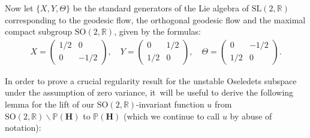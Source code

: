 \documentclass[10pt]{amsart}
\theoremstyle{plain}
\theoremstyle{definition}
\numberwithin{equation}{subsection}
\newcommand\bP{\mathbb{P}}
\newcommand\bR{\mathbb{R}}\let\R\bR
\newcommand{\SL}{\mathrm{SL}}
\newcommand{\SO}{\mathrm{SO}}
\newcommand{\bfH}{\boldsymbol{H}}
\begin{document}
Now let $\{X,Y, \Theta\}$ be the standard generators of the Lie algebra of $\SL(2, \R)$ corresponding to the geodesic flow, the orthogonal geodesic flow and the maximal compact subgroup
$\SO(2, \R)$, given by the formulas:
\begin{align*}X=\begin{pmatrix} 1/2&0\\ 0&-1/2 \end{pmatrix}, \quad Y=\begin{pmatrix} 0&1/2\\ 1/2&0 \end{pmatrix}, \quad \Theta=\begin{pmatrix} 0&-1/2\\ 1/2&0 \end{pmatrix}.
\end{align*}

In order to prove a crucial regularity result for the unstable Oseledets subspace under the assumption of zero variance, it~will be useful to derive the following lemma for the lift of our $\SO(2,\bR)$-invariant function $u$ from $\SO(2,\bR)\backslash \bP(\bfH)$ to $\bP(\bfH)$ (which we continue to call $u$ by abuse of notation):
\end{document}
